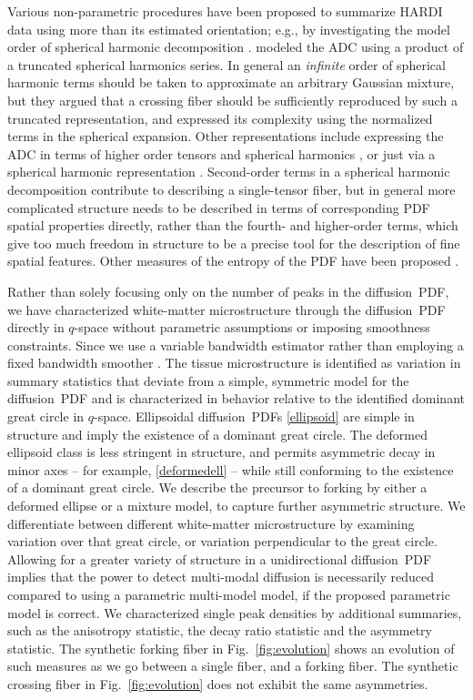 \documentclass[dvips,aoas,preprint]{imsart}
\numberwithin{equation}{section}
\theoremstyle{plain}
\begin{document}
Various non-parametric procedures have been proposed to summarize
HARDI data using more than its estimated orientation; e.g., by
investigating the model order of spherical harmonic decomposition
\citep{fra:characterization,ale-bar-arr:detection,Descoteaux:2006}.
\citet{chen2005} modeled the ADC using a product of a truncated
spherical harmonics series.  In general an {\em infinite} order of
spherical harmonic terms should be taken to approximate an arbitrary
Gaussian mixture, but they argued that a crossing fiber should be
sufficiently reproduced by such a truncated representation, and
expressed its complexity using the normalized terms in the spherical
expansion.  Other representations include expressing the ADC in terms
of higher order tensors and spherical harmonics
\citep{Descoteaux:2006}, or just via a spherical harmonic
representation \citep{fra:characterization}.
Second-order terms in a spherical harmonic decomposition contribute to
describing a single-tensor fiber, but in general more complicated
structure needs to be described in terms of corresponding PDF spatial
properties directly, rather than the fourth- and higher-order terms,
which give too much freedom in structure to be a precise tool for the
description of fine spatial features. Other measures of the entropy of
the PDF have been proposed \citep{rao2004}.

Rather than solely focusing only on the number of peaks in the
diffusion~PDF, we have characterized white-matter microstructure
through the diffusion~PDF directly in $q$-space without parametric
assumptions or imposing smoothness constraints.  Since we use a
variable bandwidth estimator rather than employing a fixed bandwidth
smoother \citep{OlhedeWhitcher}.  The tissue microstructure is
identified as variation in summary statistics that deviate from a
simple, symmetric model for the diffusion~PDF and is characterized in
behavior relative to the identified dominant great circle in
$q$-space.  Ellipsoidal diffusion~PDFs \eqref{ellipsoid} are simple in
structure and imply the existence of a dominant great circle.  The
deformed ellipsoid class is less stringent in structure, and permits
asymmetric decay in minor axes -- for example, \eqref{deformedell} --
while still conforming to the existence of a dominant great circle.
We describe the precursor to forking by either a deformed ellipse or a
mixture model, to capture further asymmetric structure.  We
differentiate between different white-matter microstructure by
examining variation over that great circle, or variation perpendicular
to the great circle.  Allowing for a greater variety of structure in a
unidirectional diffusion~PDF implies that the power to detect
multi-modal diffusion is necessarily reduced compared to using a
parametric multi-model model, if the proposed parametric model is
correct.  We characterized single peak densities by additional
summaries, such as the anisotropy statistic, the decay ratio statistic
and the asymmetry statistic.  The synthetic forking fiber in
Fig.~\ref{fig:evolution} shows an evolution of such measures as we go
between a single fiber, and a forking fiber.  The synthetic crossing
fiber in Fig.~\ref{fig:evolution} does not exhibit the same
asymmetries.
\end{document}

